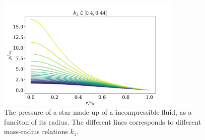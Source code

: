 \begin{figure}
    \centering
    \includegraphics[width=0.8\textwidth]{../scripts/figurer/incompressible.pdf}
    \caption{The pressure of a star made up of a incompressible fluid, as a funciton of its radius. The different lines corresponds to different mass-radius relations $k_1$.}
    \label{fig: pressure incompressible fluid}
\end{figure}

